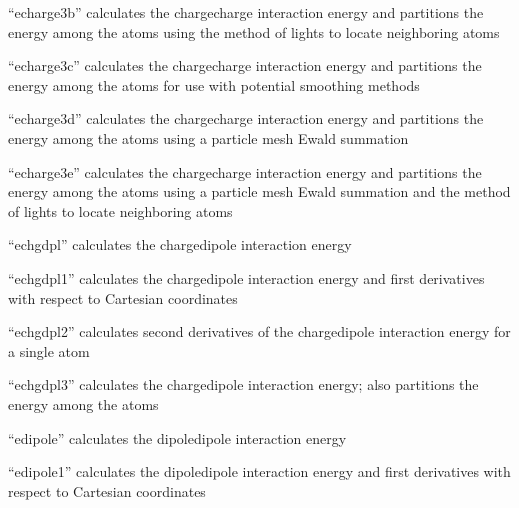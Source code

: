 \documentclass[letterpaper,11pt,english]{sphinxmanual}
\begin{document}

“echarge3b” calculates the charge\sphinxhyphen{}charge interaction energy and partitions the energy among the atoms using the method of lights to locate neighboring atoms


“echarge3c” calculates the charge\sphinxhyphen{}charge interaction energy and partitions the energy among the atoms for use with potential smoothing methods


“echarge3d” calculates the charge\sphinxhyphen{}charge interaction energy and partitions the energy among the atoms using a particle mesh Ewald summation


“echarge3e” calculates the charge\sphinxhyphen{}charge interaction energy and partitions the energy among the atoms using a particle mesh Ewald summation and the method of lights to locate neighboring atoms


“echgdpl” calculates the charge\sphinxhyphen{}dipole interaction energy


“echgdpl1” calculates the charge\sphinxhyphen{}dipole interaction energy and first derivatives with respect to Cartesian coordinates


“echgdpl2” calculates second derivatives of the charge\sphinxhyphen{}dipole interaction energy for a single atom


“echgdpl3” calculates the charge\sphinxhyphen{}dipole interaction energy; also partitions the energy among the atoms


“edipole” calculates the dipole\sphinxhyphen{}dipole interaction energy


“edipole1” calculates the dipole\sphinxhyphen{}dipole interaction energy and first derivatives with respect to Cartesian coordinates

\end{document}
